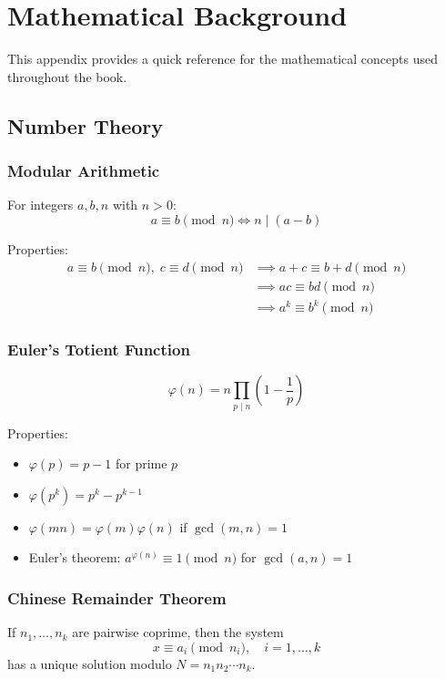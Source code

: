 \chapter{Mathematical Background}

This appendix provides a quick reference for the mathematical concepts used throughout the book.

\section{Number Theory}

\subsection{Modular Arithmetic}

For integers $a, b, n$ with $n > 0$:
\[
a \equiv b \pmod{n} \iff n \mid (a - b)
\]

Properties:
\begin{align*}
a \equiv b \pmod{n},\; c \equiv d \pmod{n} &\implies a+c \equiv b+d \pmod{n} \\
&\implies ac \equiv bd \pmod{n} \\
&\implies a^k \equiv b^k \pmod{n}
\end{align*}

\subsection{Euler's Totient Function}

\[
\varphi(n) = n \prod_{p \mid n} \left(1 - \frac{1}{p}\right)
\]

Properties:
\begin{itemize}
    \item $\varphi(p) = p-1$ for prime $p$
    \item $\varphi(p^k) = p^k - p^{k-1}$
    \item $\varphi(mn) = \varphi(m)\varphi(n)$ if $\gcd(m,n)=1$
    \item Euler's theorem: $a^{\varphi(n)} \equiv 1 \pmod{n}$ for $\gcd(a,n)=1$
\end{itemize}

\subsection{Chinese Remainder Theorem}

If $n_1, \ldots, n_k$ are pairwise coprime, then the system
\[
x \equiv a_i \pmod{n_i}, \quad i=1,\ldots,k
\]
has a unique solution modulo $N = n_1 n_2 \cdots n_k$.

